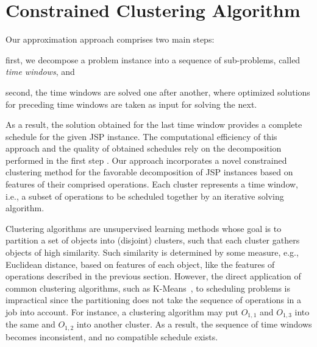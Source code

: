\documentclass[runningheads]{llncs}
\begin{document}
\section{Constrained Clustering Algorithm}
\label{sec:method}
Our approximation approach comprises two main steps: 
\begin{enumerate*}[label=\emph{(\roman*)}]
  \item first, we decompose a problem instance into a sequence of sub-problems, called \emph{time windows}, and
  \item second, the time windows are solved one after another,
        where optimized solutions for preceding time windows are taken as input for solving the next.
\end{enumerate*}
As a result, the solution obtained for the last time window provides a complete schedule for the given JSP instance.
The computational efficiency of this approach and the quality of obtained schedules rely on the decomposition performed in the first step \cite{zhang2010hybrid,zhai2014decomposition}. 
Our approach incorporates a novel constrained clustering method for the favorable decomposition of JSP instances based on features of their comprised operations. Each cluster represents a time window, i.e., a subset of operations to be scheduled together by an iterative solving algorithm.

Clustering algorithms are unsupervised learning methods whose goal is to partition a set of objects into (disjoint) clusters, such that each cluster gathers objects of high similarity. 
Such similarity is determined by some measure, e.g., Euclidean distance, based on features of each object, like the features of operations described in the previous section. 
However, the direct application of common clustering algorithms, such as K-Means~\cite{Forgy1965ClusterAO}, to scheduling problems is impractical since the partitioning does not take the sequence of operations in a job into account. For instance, a clustering algorithm may put $O_{1,1}$ and $O_{1,3}$ into the same and $O_{1,2}$ into another cluster. As a result, the sequence of time windows becomes inconsistent, and no compatible schedule exists.
\end{document}
